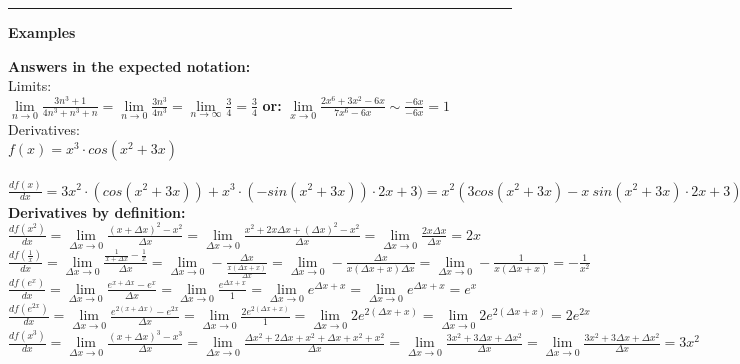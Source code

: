 \documentclass[12pt,a4paper]{report}
\begin{document}
	\rule{17cm}{1pt}
	
	\begin{center}\textbf{Examples}\end{center}
	
	\textbf{Answers in the expected notation:}\\
	Limits:\\
	$\lim\limits_{n \to 0} \frac{3n^3 + 1}{4n^3+n^3+n} = \lim\limits_{n \to 0} \frac{3n^3}{4n^3} = \lim\limits_{n \to \infty} \frac{3}{4} = \frac{3}{4}$
	\textbf{or:} $\lim\limits_{x \to 0} \frac{2x^6 + 3x^2 - 6x}{7x^6 - 6x} \sim \frac{-6x}{-6x} = 1$\\
	
	Derivatives:\\
	$f(x) = x^3 \cdot cos (x^2 + 3x)$\\\
	$\frac{df(x)}{dx} = 3x^2 \cdot (cos(x^2 + 3x)) + x^3 \cdot (-sin (x^2 + 3x)) \cdot 2x+3) = x^2 (3 cos(x^2+3x) - x \ sin(x^2 + 3x) \cdot 2x + 3)$\\
	
	\textbf{Derivatives by definition:}\\
	$\frac{df(x^2)}{dx} = \lim\limits_{\Delta x \to 0}\frac{(x+\Delta x)^2 - x^2}{\Delta x} = \lim\limits_{\Delta x \to 0}\frac{x^2 + 2x \Delta x+ (\Delta x)^2-x^2}{\Delta x} = \lim\limits_{\Delta x \to 0}\frac{2x \Delta x}{ \Delta x} = 2x$\\
	$\frac{df(\frac{1}{x})}{dx} = \lim\limits_{\Delta x \to 0} \frac{\frac{1}{x + \Delta x} - \frac{1}{x}}{\Delta x} = \lim\limits_{\Delta x \to 0} -\frac{\Delta x}{\frac{x (\Delta x + x)}{\Delta x}} = \lim\limits_{\Delta x \to 0} -\frac{\Delta x}{x (\Delta x + x) \Delta x} = \lim\limits_{\Delta x \to 0} -\frac{1}{x (\Delta x + x)} = -\frac{1}{x^2}$\\
	$\frac{df(e^x)}{dx} = \lim\limits_{\Delta x \to 0} \frac{e^{x+\Delta x} - e^x}{\Delta x} = \lim\limits_{\Delta x \to 0} \frac{e^{\Delta x + x}}{1} = \lim\limits_{\Delta x \to 0} e^{\Delta x + x} = \lim\limits_{\Delta x \to 0} e^{\Delta x + x} = e^x$\\
	$\frac{df(e^{2x})}{dx} = \lim\limits_{\Delta x \to 0} \frac{e^{2(x+\Delta x)} - e^{2x}}{\Delta x} = \lim\limits_{\Delta x \to 0} \frac{2e^{2(\Delta x + x)}}{1} = \lim\limits_{\Delta x \to 0} 2e^{2(\Delta x + x)} = \lim\limits_{\Delta x \to 0} 2e^{2(\Delta x + x)} = 2e^{2x}$\\
	$\frac{df(x^3)}{dx} = \lim\limits_{\Delta x \to 0} \frac{(x+\Delta x)^3 - x^3}{\Delta x} = \lim\limits_{\Delta x \to 0} \frac{\Delta x^2 + 2\Delta x + x^2 + \Delta x + x^2 + x^2}{\Delta x} = \lim\limits_{\Delta x \to 0} \frac{3x^2 + 3\Delta x + \Delta x^2}{\Delta x} = \lim\limits_{\Delta x \to 0} \frac{3x^2 + 3\Delta x + \Delta x^2}{\Delta x} = 3x^2$\\
	
\end{document}
